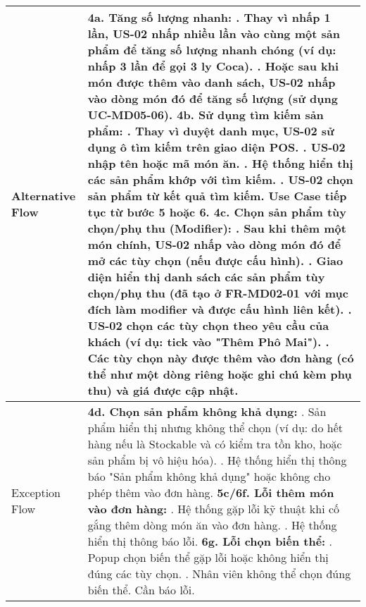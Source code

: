 \begin{longtable}{|m{4cm}|p{11cm}|}
Alternative Flow & \textbf{4a. Tăng số lượng nhanh:} \newline    1. Thay vì nhấp 1 lần, US-02 nhấp nhiều lần vào cùng một sản phẩm để tăng số lượng nhanh chóng (ví dụ: nhấp 3 lần để gọi 3 ly Coca). \newline    2. Hoặc sau khi món được thêm vào danh sách, US-02 nhấp vào dòng món đó để tăng số lượng (sử dụng UC-MD05-06). \newline \textbf{4b. Sử dụng tìm kiếm sản phẩm:} \newline    1. Thay vì duyệt danh mục, US-02 sử dụng ô tìm kiếm trên giao diện POS. \newline    2. US-02 nhập tên hoặc mã món ăn. \newline    3. Hệ thống hiển thị các sản phẩm khớp với tìm kiếm. \newline    4. US-02 chọn sản phẩm từ kết quả tìm kiếm. Use Case tiếp tục từ bước 5 hoặc 6. \newline \textbf{4c. Chọn sản phẩm tùy chọn/phụ thu (Modifier):} \newline    1. Sau khi thêm một món chính, US-02 nhấp vào dòng món đó để mở các tùy chọn (nếu được cấu hình). \newline    2. Giao diện hiển thị danh sách các sản phẩm tùy chọn/phụ thu (đã tạo ở FR-MD02-01 với mục đích làm modifier và được cấu hình liên kết). \newline    3. US-02 chọn các tùy chọn theo yêu cầu của khách (ví dụ: tick vào "Thêm Phô Mai"). \newline    4. Các tùy chọn này được thêm vào đơn hàng (có thể như một dòng riêng hoặc ghi chú kèm phụ thu) và giá được cập nhật. \\
\hline
Exception Flow & \textbf{4d. Chọn sản phẩm không khả dụng:} \newline    1. Sản phẩm hiển thị nhưng không thể chọn (ví dụ: do hết hàng nếu là Stockable và có kiểm tra tồn kho, hoặc sản phẩm bị vô hiệu hóa). \newline    2. Hệ thống hiển thị thông báo "Sản phẩm không khả dụng" hoặc không cho phép thêm vào đơn hàng. \newline \textbf{5c/6f. Lỗi thêm món vào đơn hàng:} \newline    1. Hệ thống gặp lỗi kỹ thuật khi cố gắng thêm dòng món ăn vào đơn hàng. \newline    2. Hệ thống hiển thị thông báo lỗi. \newline \textbf{6g. Lỗi chọn biến thể:} \newline    1. Popup chọn biến thể gặp lỗi hoặc không hiển thị đúng các tùy chọn. \newline    2. Nhân viên không thể chọn đúng biến thể. Cần báo lỗi. \\

\end{longtable}
